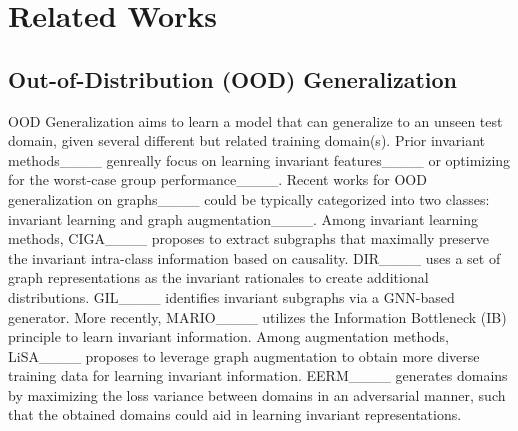 \section{Related Works}
\subsection{Out-of-Distribution (OOD) Generalization} OOD Generalization aims to learn a model that can generalize to an unseen test domain, given several different but related training domain(s). Prior invariant methods____ genreally focus on learning invariant features____ or optimizing for the worst-case group performance____. 
  Recent works for OOD generalization on graphs____ could be typically categorized into two classes: invariant learning and graph augmentation____. Among invariant learning methods, CIGA____ proposes to extract subgraphs that maximally preserve the invariant intra-class information based on causality. 
  DIR____ uses a set of graph representations as the invariant rationales 
  to create additional distributions. GIL____ identifies invariant subgraphs via a GNN-based generator.
  More recently, 
  MARIO____ utilizes the Information Bottleneck (IB) principle to learn invariant information. 
 Among augmentation methods, LiSA____ proposes to leverage graph augmentation to obtain more diverse training data for learning invariant information. 
 EERM____ generates domains by maximizing the loss variance between domains in an adversarial manner, such that the obtained domains could aid in learning invariant representations. 


